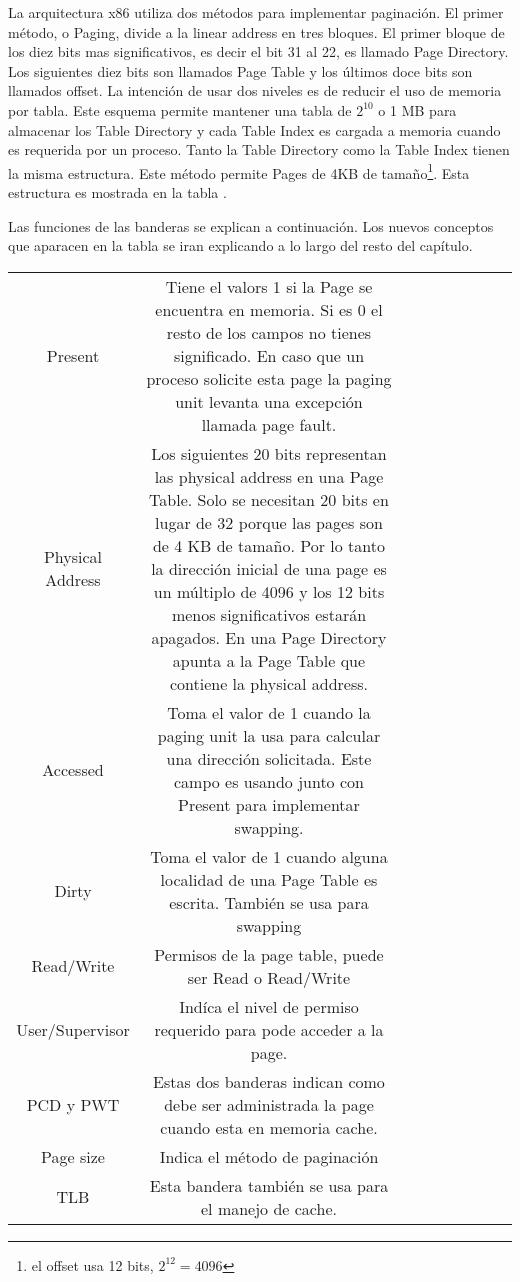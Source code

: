La arquitectura x86 utiliza dos métodos para implementar paginación. El primer
método, o Paging, divide a la linear address en tres bloques. El primer bloque
de los diez bits mas significativos, es decir el bit 31 al 22, es llamado Page
Directory. Los siguientes diez bits son llamados Page Table y los últimos doce
bits son llamados offset. La intención de usar dos niveles es de reducir el uso
de memoria por tabla. Este esquema permite mantener una tabla de $2^10$ o 1 MB
para almacenar los Table Directory y cada Table Index es cargada a memoria
cuando es requerida por un proceso. Tanto la Table Directory como la Table
Index tienen la misma estructura. Este método permite Pages de 4KB de
tamaño\footnote{el offset usa 12 bits, $2^12=4096$}. Esta estructura es
mostrada en la tabla {}.

Las funciones de las banderas se explican a continuación. Los nuevos conceptos
que aparacen en la tabla se iran explicando a lo largo del resto del capítulo.
\begin{tabular}{ccccccccc} Present & Tiene el valors 1 si la Page se encuentra
en memoria. Si es 0 el resto de los campos no tienes significado. En caso que
un proceso solicite esta page la paging unit levanta una excepción llamada page
fault. \\ Physical Address & Los siguientes 20 bits representan las physical
address en una Page Table. Solo se necesitan 20 bits en lugar de 32 porque las
pages son de 4 KB de tamaño. Por lo tanto la dirección inicial de una page es
un múltiplo de 4096 y los 12 bits menos significativos estarán apagados. En una
Page Directory apunta a la Page Table que contiene la physical address.\\
Accessed & Toma el valor de 1 cuando la paging unit la usa para calcular una
dirección solicitada. Este campo es usando junto con Present para implementar
swapping. \\ Dirty & Toma el valor de 1 cuando alguna localidad de una Page
Table es escrita. También se usa para swapping\\ Read/Write& Permisos de la
page table, puede ser Read o Read/Write \\ User/Supervisor & Indíca el nivel de
permiso requerido para pode acceder a la page.\\ PCD y PWT & Estas dos banderas
indican como debe ser administrada la page cuando esta en memoria cache. \\
Page size & Indica el método de paginación \\ TLB & Esta bandera también se usa
para el manejo de cache. \end{tabular}

